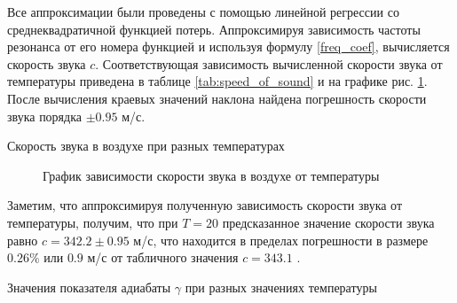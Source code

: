 \documentclass[a4paper,12pt]{article}
\begin{document}
Все аппроксимации были проведены с помощью линейной регрессии со среднеквадратичной функцией потерь. Аппроксимируя зависимость частоты резонанса от его номера функцией и используя формулу \eqref{freq_coef}, вычисляется скорость звука $ c $. Соответствующая зависимость вычисленной скорости звука от температуры приведена в таблице \ref{tab:speed_of_sound} и на графике рис. \ref{fig:speed_of_sound}. После вычисления краевых значений наклона найдена погрешность скорости звука порядка $ \pm 0.95 $ м/с.

\begin{table}[H]
  \centering
  \caption{Скорость звука в воздухе при разных температурах}
  \label{tab:speed_of_sound}
\end{table}

\begin{figure}[h]
  \centering
  
  \caption{График зависимости скорости звука в воздухе от температуры}
  \label{fig:speed_of_sound}
\end{figure}

Заметим, что аппроксимируя полученную зависимость скорости звука от температуры, получим, что при $ T = 20 $ \textcelsius{} предсказанное значение скорости звука равно $ c = 342.2 \pm 0.95 $ м/с, что находится в пределах погрешности в размере $ 0.26 \% $ или $ 0.9 $ м/с от табличного значения $ c = 343.1 $ \textcelsius.

\begin{table}[H]
  \centering
  \caption{Значения показателя адиабаты $ \gamma $ при разных значениях температуры}
  \label{tab:gamma}
\end{table}
\end{document}
